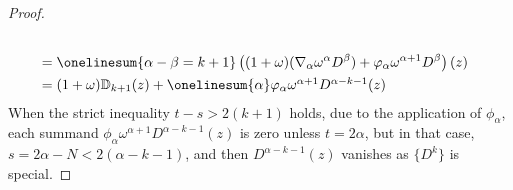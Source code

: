 \documentclass[11pt]{amsart} \renewcommand{\baselinestretch}{1.2}
\theoremstyle{plain}
\numberwithin{equation}{section} %
\theoremstyle{plain}
\numberwithin{equation}{chapter} %
\let\oldphi\phi
\let\phi\varphi
\newcommand{\twist}{\omega}
\newcommand{\Nabla}{\nabla}
\begin{document}
\begin{second quadrant homotopy sseq operations}
\begin{proof}
\begin{alignat*}{2}
\\
&=
\onelinesum{\alpha-\beta=k+1} \left((1+\twist)(\Nabla_\alpha\twist^\alpha D^\beta)+ \oldphi_{\alpha}\twist^{\alpha+1} D^\beta\right)(z)%
\\
&=
(1+\twist)\mathbb{D}_{k+1}(z)+\onelinesum{\alpha} \textstyle\oldphi_{\alpha}\twist^{\alpha+1} D^{\alpha-k-1}(z)%
\end{alignat*}
When the strict inequality $t-s>2(k+1)$ holds, due to the application of $\oldphi_{\alpha}$, each summand $\oldphi_{\alpha}\twist^{\alpha+1} D^{\alpha-k-1}(z)$ is zero unless $t=2\alpha$, but in that case, $s=2\alpha-N<2(\alpha-k-1)$, and then $D^{\alpha-k-1}(z)$ vanishes as $\{D^k\}$ is special.
%
\end{proof}


















\end{second quadrant homotopy sseq operations}
\end{document}
